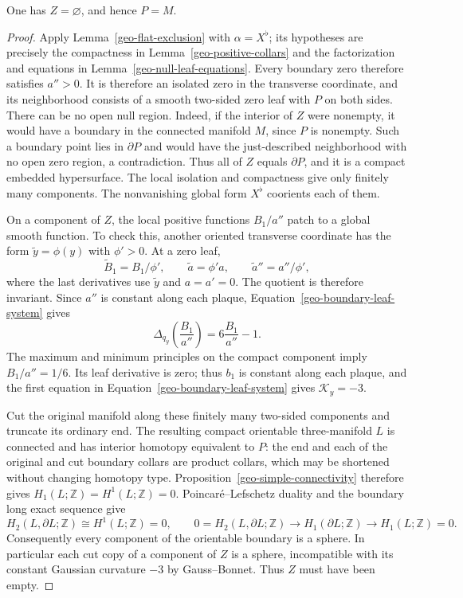 \begin{proposition}
\label{geo-no-null-set}
One has $Z=\varnothing$, and hence $P=M$.
\end{proposition}
\begin{proof}
Apply Lemma~\ref{geo-flat-exclusion} with $\alpha=X^\flat$; its hypotheses
are precisely the compactness in Lemma~\ref{geo-positive-collars} and the
factorization and equations in Lemma~\ref{geo-null-leaf-equations}.
Every boundary zero therefore satisfies $a''>0$.
It is therefore an isolated zero in the transverse coordinate, and its
neighborhood consists of a smooth two-sided zero leaf with $P$ on both
sides.  There can be no open null region.  Indeed, if the interior of $Z$
were nonempty, it would have a boundary in the connected manifold $M$,
since $P$ is nonempty.  Such a boundary point lies in $\partial P$ and would
have the just-described neighborhood with no open zero region, a
contradiction.  Thus all of $Z$ equals $\partial P$, and it is a compact
embedded hypersurface.  The local isolation and compactness give only
finitely many components.  The nonvanishing global form $X^\flat$ coorients
each of them.

On a component of $Z$, the local positive functions $B_1/a''$ patch to a
global smooth function.  To check this, another oriented transverse
coordinate has the form $\widetilde y=\phi(y)$ with $\phi'>0$.  At a zero
leaf,
\[
 \widetilde B_1=B_1/\phi',\qquad
 \widetilde a=\phi'a,\qquad
 \widetilde a''=a''/\phi',
\]
where the last derivatives use $\widetilde y$ and $a=a'=0$.
The quotient is therefore invariant.  Since $a''$ is constant along each
plaque, Equation~\eqref{geo-boundary-leaf-system} gives
\[
 \Delta_{q_y}\left(\frac{B_1}{a''}\right)
                 =6\frac{B_1}{a''}-1.
\]
The maximum and minimum principles on the compact component imply
$B_1/a''=1/6$.  Its leaf derivative is zero; thus $b_1$ is constant along
each plaque, and the first equation in
Equation~\eqref{geo-boundary-leaf-system} gives $\mathcal K_y=-3$.

Cut the original manifold along these finitely many two-sided components
and truncate its ordinary end.  The resulting compact orientable
three-manifold $L$ is connected and has interior homotopy equivalent to
$P$: the end and each of the original and cut boundary collars are product
collars, which may be shortened without changing homotopy type.
Proposition~\ref{geo-simple-connectivity} therefore gives
$H_1(L;\mathbb Z)=H^1(L;\mathbb Z)=0$.  Poincar\'e--Lefschetz duality and
the boundary long exact sequence give
\[
 H_2(L,\partial L;\mathbb Z)\cong H^1(L;\mathbb Z)=0,
 \qquad
 0=H_2(L,\partial L;\mathbb Z)\longrightarrow
 H_1(\partial L;\mathbb Z)\longrightarrow H_1(L;\mathbb Z)=0.
\]
Consequently every component of the orientable boundary is a sphere.  In
particular each cut copy of a component of $Z$ is a sphere, incompatible
with its constant Gaussian curvature $-3$ by Gauss--Bonnet.  Thus $Z$ must
have been empty.
\end{proof}

